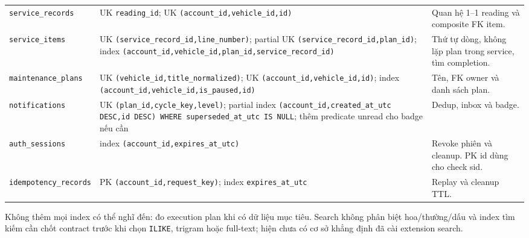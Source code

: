 \begin{smalltable}
\begin{longtable}{L{3.0cm}L{3.2cm}L{8.2cm}}
\texttt{service\_\allowbreak{}records} & UK \texttt{reading\_\allowbreak{}id}; UK \texttt{(account\_\allowbreak{}id,\allowbreak{}vehicle\_\allowbreak{}id,\allowbreak{}id)} & Quan hệ 1–1 reading và composite FK item.\\
\texttt{service\_\allowbreak{}items} & UK \texttt{(service\_\allowbreak{}record\_\allowbreak{}id,\allowbreak{}line\_\allowbreak{}number)}; partial UK \texttt{(service\_\allowbreak{}record\_\allowbreak{}id,\allowbreak{}plan\_\allowbreak{}id)}; index \texttt{(account\_\allowbreak{}id,\allowbreak{}vehicle\_\allowbreak{}id,\allowbreak{}plan\_\allowbreak{}id,\allowbreak{}service\_\allowbreak{}record\_\allowbreak{}id)} & Thứ tự dòng, không lặp plan trong service, tìm completion.\\
\texttt{maintenance\_\allowbreak{}plans} & UK \texttt{(vehicle\_\allowbreak{}id,\allowbreak{}title\_\allowbreak{}normalized)}; UK \texttt{(account\_\allowbreak{}id,\allowbreak{}vehicle\_\allowbreak{}id,\allowbreak{}id)}; index \texttt{(account\_\allowbreak{}id,\allowbreak{}vehicle\_\allowbreak{}id,\allowbreak{}is\_\allowbreak{}paused,\allowbreak{}id)} & Tên, FK owner và danh sách plan.\\
\texttt{notifications} & UK \texttt{(plan\_\allowbreak{}id,\allowbreak{}cycle\_\allowbreak{}key,\allowbreak{}level)}; partial index \texttt{(account\_\allowbreak{}id,\allowbreak{}created\_\allowbreak{}at\_\allowbreak{}utc DESC,\allowbreak{}id DESC) WHERE superseded\_\allowbreak{}at\_\allowbreak{}utc IS NULL}; thêm predicate unread cho badge nếu cần & Dedup, inbox và badge.\\
\texttt{auth\_\allowbreak{}sessions} & index \texttt{(account\_\allowbreak{}id,\allowbreak{}expires\_\allowbreak{}at\_\allowbreak{}utc)} & Revoke phiên và cleanup. PK id dùng cho check sid.\\
\texttt{idempotency\_\allowbreak{}records} & PK \texttt{(account\_\allowbreak{}id,\allowbreak{}request\_\allowbreak{}key)}; index \texttt{expires\_\allowbreak{}at\_\allowbreak{}utc} & Replay và cleanup TTL.\\
\bottomrule\end{longtable}\end{smalltable}
Không thêm mọi index có thể nghĩ đến: đo execution plan khi có dữ liệu mục tiêu. Search không phân biệt hoa/thường/dấu và index tìm kiếm cần chốt contract trước khi chọn \texttt{ILIKE}, trigram hoặc full-text; hiện chưa có cơ sở khẳng định đã cài extension search.\par
